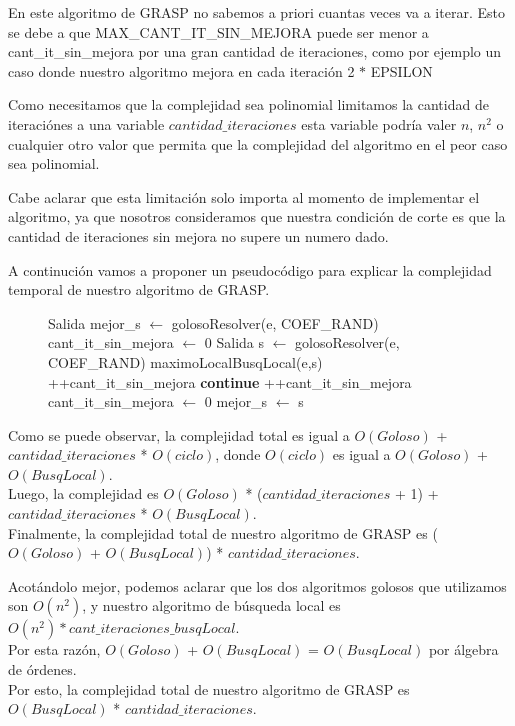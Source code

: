 En este algoritmo de GRASP no sabemos a priori cuantas veces va a iterar. Esto se debe a que MAX\_CANT\_IT\_SIN\_MEJORA puede ser menor a cant\_it\_sin\_mejora por una gran cantidad de iteraciones, como por ejemplo un caso donde nuestro algoritmo mejora en cada iteración 2 $*$ EPSILON

Como necesitamos que la complejidad sea polinomial limitamos la cantidad de iteraciónes a una variable $cantidad\_iteraciones$ esta variable podría valer $n$, $n^2$ o cualquier otro valor que permita que la complejidad del algoritmo en el peor caso sea polinomial.

Cabe aclarar que esta limitación solo importa al momento de implementar el algoritmo, ya que nosotros consideramos que nuestra condición de corte es que la cantidad de iteraciones sin mejora no supere un numero dado.

A continución vamos a proponer un pseudocódigo para explicar la complejidad temporal de nuestro algoritmo de GRASP.

\begin{center}
 \begin{figure}[H]
  \begin{pseudo}
    \State Salida mejor\_s $\leftarrow$ golosoResolver(e, COEF\_RAND) 
    \State cant\_it\_sin\_mejora $\leftarrow$ 0 
      \State Salida s $\leftarrow$ golosoResolver(e, COEF\_RAND) 
      \State maximoLocalBusqLocal(e,s) 
       
	\State++cant\_it\_sin\_mejora 
	\State \textbf{continue}
      \EndIf
       
	\State ++cant\_it\_sin\_mejora 
      \Else
	\State cant\_it\_sin\_mejora $\leftarrow$ 0 
      \EndIf
       
	\State mejor\_s $\leftarrow$ s 
      \EndIf
    \EndWhile
    \EndProcedure
  \end{pseudo}
 \end{figure}
\end{center}

Como se puede observar, la complejidad total es igual a $O(Goloso)$ + $cantidad\_iteraciones$ * $O(ciclo)$, donde $O(ciclo)$ es igual a  $O(Goloso)$ + $O(BusqLocal)$.\\
Luego, la complejidad es $O(Goloso)$ * ($cantidad\_iteraciones$ + 1) + $cantidad\_iteraciones$ * $O(BusqLocal)$.\\
Finalmente, la complejidad total de nuestro algoritmo de GRASP es ($O(Goloso)$ + $O(BusqLocal)$) * $cantidad\_iteraciones$.

Acotándolo mejor, podemos aclarar que los dos algoritmos golosos que utilizamos son $O(n^2)$, y nuestro algoritmo de búsqueda local es $O(n^2) * cant\_iteraciones\_busqLocal$.\\
Por esta razón, $O(Goloso)$ + $O(BusqLocal)$ = $O(BusqLocal)$ por álgebra de órdenes.\\
Por esto, la complejidad total de nuestro algoritmo de GRASP es $O(BusqLocal)$ * $cantidad\_iteraciones$.
